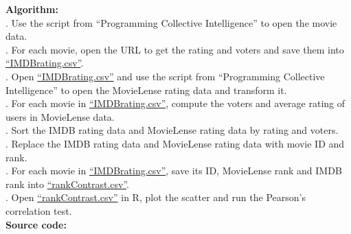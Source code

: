 \documentclass{article}
\begin{document}
		\noindent\textbf{Algorithm:}\\
		. Use the script from ``Programming Collective Intelligence'' to open the movie data.\\
		. For each movie, open the URL to get the rating and voters and save them into \href{https://github.com/zhangboroy/cs532-s17/blob/master/assg07_submission/IMDBrating.csv}{``IMDBrating.csv''}.\\
		. Open \href{https://github.com/zhangboroy/cs532-s17/blob/master/assg07_submission/IMDBrating.csv}{``IMDBrating.csv''} and use the script from ``Programming Collective Intelligence'' to open the MovieLense rating data and transform it.\\
		. For each movie in \href{https://github.com/zhangboroy/cs532-s17/blob/master/assg07_submission/IMDBrating.csv}{``IMDBrating.csv''}, compute the voters and average rating of users in MovieLense data.\\
		. Sort the IMDB rating data and MovieLense rating data by rating and voters.\\
		. Replace the IMDB rating data and MovieLense rating data with movie ID and rank.\\
		. For each movie in \href{https://github.com/zhangboroy/cs532-s17/blob/master/assg07_submission/IMDBrating.csv}{``IMDBrating.csv''}, save its ID, MovieLense rank and IMDB rank into \href{https://github.com/zhangboroy/cs532-s17/blob/master/assg07_submission/rankContrast.csv}{``rankContrast.csv''}.\\
		. Open \href{https://github.com/zhangboroy/cs532-s17/blob/master/assg07_submission/rankContrast.csv}{``rankContrast.csv''} in R, plot the scatter and run the Pearson's correlation test.\\

		\noindent\textbf{Source code:}
		
		
		
\end{document}
